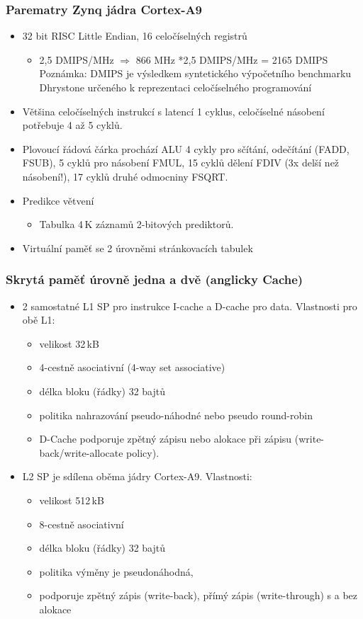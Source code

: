 \documentclass{beamer}
\begin{document}
\begin{frame}
\frametitle{Parematry Zynq jádra Cortex-A9}

\begin{itemize}
 \item 32 bit RISC Little Endian, 16 celočíselných registrů
 \begin{itemize}
  \item 2,5 DMIPS/MHz $\Rightarrow$ 866 MHz *2,5 DMIPS/MHz = 2165 DMIPS
  {\newline Poznámka: DMIPS je výsledkem syntetického výpočetního benchmarku Dhrystone určeného k reprezentaci celočíselného programování}
 \end{itemize}
 \item Většina celočíselných instrukcí s latencí 1 cyklus, celočíselné násobení potřebuje 4 až 5 cyklů.
 \item  Plovoucí řádová čárka prochází ALU 4 cykly pro sčítání, odečítání (FADD, FSUB), 5 cyklů pro násobení FMUL, 15 cyklů dělení FDIV (3x delší než násobení!), 17 cyklů druhé odmocniny FSQRT.
 \item Predikce větvení
 \begin{itemize}
  \item Tabulka 4\,K záznamů 2-bitových prediktorů.
 \end{itemize}
 \item Virtuální paměť se 2 úrovněmi stránkovacích tabulek
\end{itemize}

\end{frame}

\begin{frame}
\frametitle{Skrytá paměť úrovně jedna a dvě (anglicky Cache)}
\begin{itemize}
 \item 2 samostatné L1 SP pro instrukce I-cache a D-cache pro data. Vlastnosti pro obě L1:
 \begin{itemize}
  \item velikost 32\,kB
  \item 4-cestně asociativní (4-way set associative)
  \item délka bloku (řádky) 32 bajtů
  \item politika nahrazování pseudo-náhodné nebo pseudo round-robin
  \item D-Cache podporuje zpětný zápisu nebo alokace při zápisu (write-back/write-allocate policy).
 \end{itemize}
 \item L2 SP je sdílena oběma jádry Cortex-A9. Vlastnosti:
 \begin{itemize}
   \item velikost 512\,kB
   \item 8-cestně asociativní
   \item délka bloku (řádky) 32 bajtů
   \item politika výměny je pseudonáhodná,
   \item  podporuje zpětný zápis (write-back), přímý zápis (write-through) s a bez alokace
 \end{itemize}
\end{itemize}

\end{frame}
\end{document}
